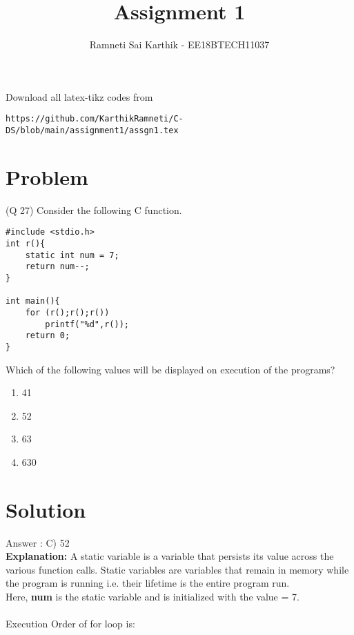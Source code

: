 \documentclass[journal,12pt,twocolumn]{IEEEtran}
\begin{document}
\makeatletter
{}
\makeatother
\let\StandardTheFigure\thefigure
\let\vec\mathbf
\renewcommand{\thefigure}{\theproblem}
\def\putbox#1#2#3{\makebox[0in][l]{\makebox[#1][l]{}\raisebox{\baselineskip}[0in][0in]{\raisebox{#2}[0in][0in]{#3}}}}
     \def\rightbox#1{\makebox[0in][r]{#1}}
     \def\centbox#1{\makebox[0in]{#1}}
     \def\topbox#1{\raisebox{-\baselineskip}[0in][0in]{#1}}
     \def\midbox#1{\raisebox{-0.5\baselineskip}[0in][0in]{#1}}
\vspace{3cm}
\title{Assignment 1}
\author{Ramneti Sai Karthik - EE18BTECH11037}
\maketitle
\newpage
\bigskip
\renewcommand{\thefigure}{\theenumi}
\renewcommand{\thetable}{\theenumi}
Download all latex-tikz codes from 
%
\begin{lstlisting}
https://github.com/KarthikRamneti/C-DS/blob/main/assignment1/assgn1.tex
\end{lstlisting}
\setcounter{figure}{0}
\section{Problem}
(Q 27) Consider the following C function.
\begin{lstlisting}
#include <stdio.h>
int r(){
    static int num = 7;
    return num--;
}

int main(){
    for (r();r();r())
        printf("%d",r());
    return 0;
} 
\end{lstlisting}
\setcounter{figure}{0}
Which of the following values will be displayed on execution of the programs?
\begin{enumerate}
    \item 41
    \item 52
    \item 63
    \item 630
\end{enumerate}

\section{Solution}
Answer : C) 52
\newline
\\
\textbf{Explanation:}
\newline
A static variable is a variable that persists its value across the various function calls. Static variables are variables that remain in memory while the program is running i.e. their lifetime is the entire program run.
\\
Here, \textbf{num} is the static variable and is initialized with the value = 7.
\\
\\
Execution Order of for loop is:
\end{document}

